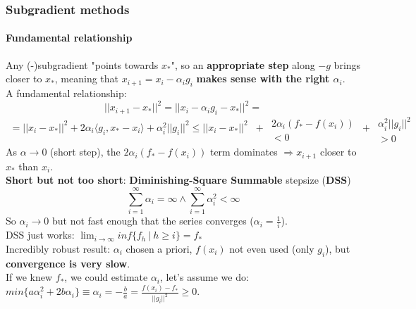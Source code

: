 \documentclass[10pt]{report}
\begin{document}
\subsubsection{Subgradient methods}
\paragraph{Fundamental relationship} Any (-)subgradient "points towards $x_*$", so an \textbf{appropriate step} along $-g$ brings closer to $x_*$, meaning that $x_{i+1} = x_i - \alpha_ig_i$ \textbf{makes sense with the right $\alpha_i$}.\\
A fundamental relationship: $$||x_{i+1}-x_*||^2 = ||x_i - \alpha_ig_i - x_*||^2 =$$
$$\begin{array}{c}
= ||x_i-x_*||^2+2\alpha_i\langle g_i, x_*-x_i\rangle + \alpha_i^2||g_i||^2 \leq ||x_i - x_*||^2\\\:
\end{array}
\begin{array}{c}
+\\\:
\end{array}
\begin{array}{c}
2\alpha_i(f_*-f(x_i))\\<0
\end{array}\begin{array}{c}
+\\\:
\end{array}\begin{array}{c}
\alpha_i^2||g_i||^2\\>0
\end{array}$$
As $\alpha \rightarrow 0$ (short step), the $2\alpha_i(f_*-f(x_i))$ term dominates $\Rightarrow x_{i+1}$ closer to $x_*$ than $x_i$.\\
\textbf{Short but not too short}: \textbf{Diminishing-Square Summable} stepsize (\textbf{DSS}) $$\sum_{i=1}^\infty\alpha_i = \infty\wedge\sum_{i=1}^\infty\alpha_i^2<\infty$$
So $\alpha_i\rightarrow 0$ but not fast enough that the series converges ($\alpha_i = \frac{1}{i}$).\\
DSS just works: $\lim_{i\to\infty} inf\{f_h\:|\:h\geq i\} = f_*$\\
Incredibly robust result: $\alpha_i$ chosen a priori, $f(x_i)$ not even used (only $g_i$), but \textbf{convergence is very slow}.\\
If we knew $f_*$, we could estimate $\alpha_i$, let's assume we do: $min\{a\alpha_i^2+2b\alpha_i\}\equiv \alpha_i = -\frac{b}{a} = \frac{f(x_i)-f_*}{||g_i||^2} \geq 0$.\\
\end{document}
